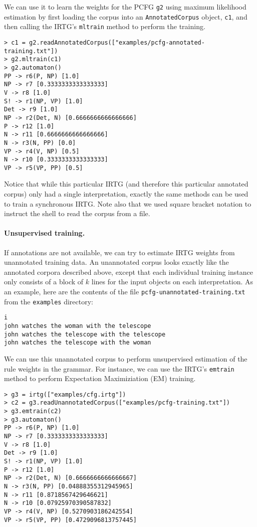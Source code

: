\documentclass[11pt]{article}
\begin{document}
We can use it to learn the weights for the PCFG \verb?g2? using
maximum likelihood estimation by first loading the corpus into an
\verb?AnnotatedCorpus? object, \verb?c1?, and then calling the
IRTG's \verb?mltrain? method to perform the training.

\begin{verbatim}
> c1 = g2.readAnnotatedCorpus(["examples/pcfg-annotated-training.txt"])
> g2.mltrain(c1)
> g2.automaton()
PP -> r6(P, NP) [1.0]
NP -> r7 [0.3333333333333333]
V -> r8 [1.0]
S! -> r1(NP, VP) [1.0]
Det -> r9 [1.0]
NP -> r2(Det, N) [0.6666666666666666]
P -> r12 [1.0]
N -> r11 [0.6666666666666666]
N -> r3(N, PP) [0.0]
VP -> r4(V, NP) [0.5]
N -> r10 [0.3333333333333333]
VP -> r5(VP, PP) [0.5]
\end{verbatim}

Notice that while this particular IRTG (and therefore this particular
annotated corpus) only had a single interpretation, exactly the same
methods can be used to train a synchronous IRTG.  Note also that we
used square bracket notation to instruct the shell to read the corpus
from a file.


\paragraph{Unsupervised training.}
If annotations are not available, we can try to estimate IRTG weights
from unannotated training data. An unannotated corpus looks exactly
like the annotated corpora described above, except that each
individual training instance only consists of a block of $k$ lines for
the input objects on each interpretation. As an example, here are the
contents of the file \verb?pcfg-unannotated-training.txt? from the
\verb?examples? directory:

\begin{verbatim}
i
john watches the woman with the telescope
john watches the telescope with the telescope
john watches the telescope with the woman
\end{verbatim}

We can use this unannotated corpus to perform unsupervised estimation
of the rule weights in the grammar.  For instance, we can use the
IRTG's \verb?emtrain? method to perform Expectation Maximiziation (EM)
training.

\begin{verbatim}
> g3 = irtg(["examples/cfg.irtg"])
> c2 = g3.readUnannotatedCorpus(["examples/pcfg-training.txt"])
> g3.emtrain(c2)
> g3.automaton()
PP -> r6(P, NP) [1.0]
NP -> r7 [0.3333333333333333]
V -> r8 [1.0]
Det -> r9 [1.0]
S! -> r1(NP, VP) [1.0]
P -> r12 [1.0]
NP -> r2(Det, N) [0.6666666666666667]
N -> r3(N, PP) [0.04888355312945965]
N -> r11 [0.8718567429646621]
N -> r10 [0.07925970390587832]
VP -> r4(V, NP) [0.5270903186242554]
VP -> r5(VP, PP) [0.4729096813757445]
\end{verbatim}
\end{document}
